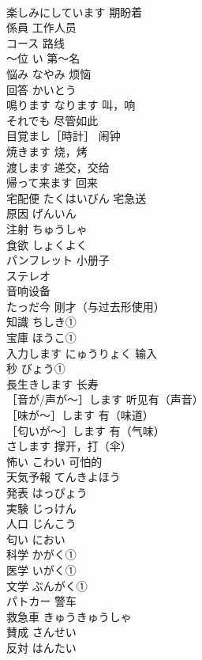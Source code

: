\documentclass[8pt]{extreport}
\begin{document}
\begin{CJK}{UTF8}{min}
\\	楽しみにしています	期盼着	
\\	係員	工作人员	
\\	コース	路线	
\\	〜位	い 第～名	
\\	悩み	なやみ 烦恼	
\\	回答	かいとう	
\\	鳴ります	なります 叫，响	
\\	それでも	尽管如此	
\\	目覚まし［時計］	闹钟	
\\	焼きます	烧，烤	
\\	渡します	递交，交给	
\\	帰って来ます	回来	
\\	宅配便	たくはいびん 宅急送	
\\	原因	げんいん	
\\	注射	ちゅうしゃ	
\\	食欲	しょくよく	
\\	パンフレット	小册子	
\\	ステレオ	
\\	音响设备	
\\	たっだ今	刚才（与过去形使用）	
\\	知識	ちしき①	
\\	宝庫	ほうこ①	
\\	入力します	にゅうりょく 输入	
\\	秒	びょう①	
\\	長生きします	长寿	
\\	［音が/声が〜］します	听见有（声音）	
\\	［味が〜］します	有（味道）	
\\	［匂いが〜］します	有（气味）	
\\	さします	撑开，打（伞）	
\\	怖い	こわい 可怕的	
\\	天気予報	てんきよほう	
\\	発表	はっぴょう	
\\	実験	じっけん	
\\	人口	じんこう	
\\	匂い	におい	
\\	科学	かがく①	
\\	医学	いがく①	
\\	文学	ぶんがく①	
\\	パトカー	警车	
\\	救急車	きゅうきゅうしゃ	
\\	賛成	さんせい	
\\	反対	はんたい	

\end{CJK}
\end{document}
